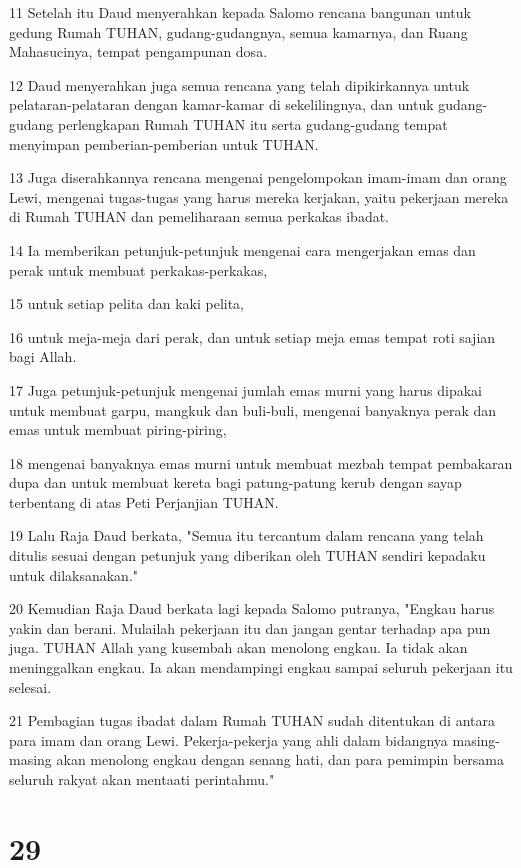 \par 11 Setelah itu Daud menyerahkan kepada Salomo rencana bangunan untuk gedung Rumah TUHAN, gudang-gudangnya, semua kamarnya, dan Ruang Mahasucinya, tempat pengampunan dosa.
\par 12 Daud menyerahkan juga semua rencana yang telah dipikirkannya untuk pelataran-pelataran dengan kamar-kamar di sekelilingnya, dan untuk gudang-gudang perlengkapan Rumah TUHAN itu serta gudang-gudang tempat menyimpan pemberian-pemberian untuk TUHAN.
\par 13 Juga diserahkannya rencana mengenai pengelompokan imam-imam dan orang Lewi, mengenai tugas-tugas yang harus mereka kerjakan, yaitu pekerjaan mereka di Rumah TUHAN dan pemeliharaan semua perkakas ibadat.
\par 14 Ia memberikan petunjuk-petunjuk mengenai cara mengerjakan emas dan perak untuk membuat perkakas-perkakas,
\par 15 untuk setiap pelita dan kaki pelita,
\par 16 untuk meja-meja dari perak, dan untuk setiap meja emas tempat roti sajian bagi Allah.
\par 17 Juga petunjuk-petunjuk mengenai jumlah emas murni yang harus dipakai untuk membuat garpu, mangkuk dan buli-buli, mengenai banyaknya perak dan emas untuk membuat piring-piring,
\par 18 mengenai banyaknya emas murni untuk membuat mezbah tempat pembakaran dupa dan untuk membuat kereta bagi patung-patung kerub dengan sayap terbentang di atas Peti Perjanjian TUHAN.
\par 19 Lalu Raja Daud berkata, "Semua itu tercantum dalam rencana yang telah ditulis sesuai dengan petunjuk yang diberikan oleh TUHAN sendiri kepadaku untuk dilaksanakan."
\par 20 Kemudian Raja Daud berkata lagi kepada Salomo putranya, "Engkau harus yakin dan berani. Mulailah pekerjaan itu dan jangan gentar terhadap apa pun juga. TUHAN Allah yang kusembah akan menolong engkau. Ia tidak akan meninggalkan engkau. Ia akan mendampingi engkau sampai seluruh pekerjaan itu selesai.
\par 21 Pembagian tugas ibadat dalam Rumah TUHAN sudah ditentukan di antara para imam dan orang Lewi. Pekerja-pekerja yang ahli dalam bidangnya masing-masing akan menolong engkau dengan senang hati, dan para pemimpin bersama seluruh rakyat akan mentaati perintahmu."

\chapter{29}

